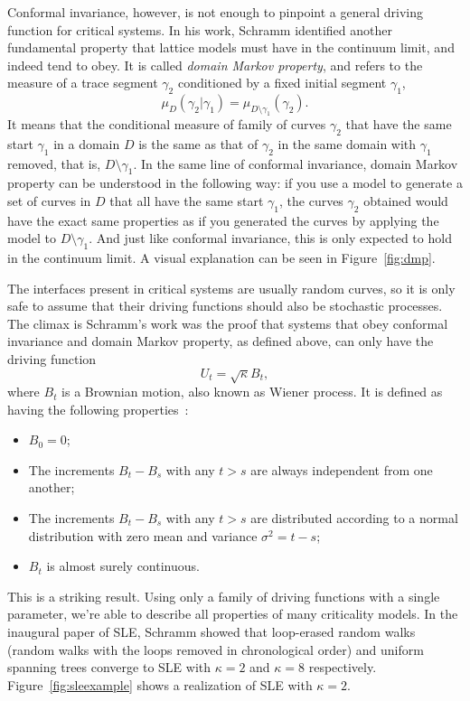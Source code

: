 Conformal invariance, however, is not enough to pinpoint a general driving
function for critical systems. In his work, Schramm identified another
fundamental property that lattice models must have in the continuum limit, and
indeed tend to obey. It is called \textit{domain Markov property}, and refers
to the measure of a trace segment $\gamma_2$ conditioned by a
fixed initial segment $\gamma_1$,
\begin{equation}
    \newcommand{\pp}[1]{\left(#1\right)}
    \mu_D\pp{\gamma_2|\gamma_1} = \mu_{D\setminus\gamma_1}\pp{\gamma_2}.
\end{equation}
It means that the conditional measure of family of curves $\gamma_2$ that have the
same start $\gamma_1$ in a domain $D$ is the same as that of $\gamma_2$ in
the same domain with $\gamma_1$ removed, that is, $D\setminus\gamma_1$.
In the same line of conformal invariance, domain Markov property can be
understood in the following way: if you use a model to generate a set of curves
in $D$ that all have the same start $\gamma_1$, the curves $\gamma_2$ obtained
would have the exact same properties as if you generated the curves by applying
the model to $D\setminus\gamma_1$. And just like conformal invariance, this is
only expected to hold in the continuum limit. A visual explanation can be seen
in Figure~\ref{fig:dmp}.

The interfaces present in critical systems are usually random curves, so it is
only safe to assume that their driving functions should also be stochastic
processes. The climax is Schramm's work was the proof that systems that obey
conformal invariance and domain Markov property, as defined above, can only
have the driving function
\begin{equation}
    U_{t}=\sqrt{\kappa}B_{t},
\end{equation}
where $B_t$ is a Brownian motion, also known as Wiener process.
It is defined as having the following properties~\cite{Durrett1996}:
\begin{itemize}
    \item $B_0=0$;
    \item The increments $B_t-B_s$ with any $t>s$ are always independent from
        one another;
    \item The increments $B_t-B_s$ with any $t>s$ are distributed according to
        a normal distribution with zero mean and variance $\sigma^2=t-s$;
    \item $B_t$ is almost surely continuous.
\end{itemize}
This is a striking result. Using only a family of driving functions with a
single parameter, we're able to describe all properties of many criticality
models. In the inaugural paper of SLE, Schramm showed that loop-erased random
walks (random walks with the loops removed in chronological order) and uniform
spanning trees converge to SLE with $\kappa=2$ and $\kappa=8$ respectively.
Figure~\ref{fig:sleexample} shows a realization of SLE with $\kappa=2$.

